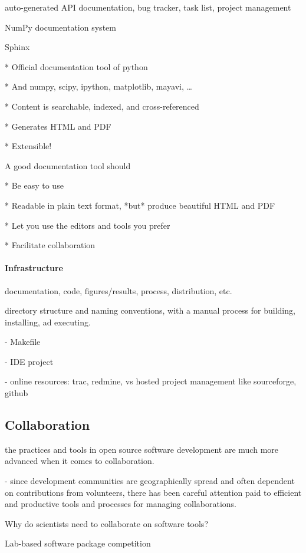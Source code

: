 \documentclass[ChapterTOCs,krantz2]{krantz} %
\begin{document}
auto-generated API documentation, bug tracker, task list, project management

NumPy documentation system \cite{SciPyProceedings_27}

Sphinx

* Official documentation tool of python

* And numpy, scipy, ipython, matplotlib, mayavi, \ldots

* Content is searchable, indexed, and cross-referenced

* Generates HTML and PDF

* Extensible!

A good documentation tool should

* Be easy to use

* Readable in plain text format, *but* produce beautiful HTML and PDF

* Let you use the editors and tools you prefer

* Facilitate collaboration

\paragraph{ {\bf Infrastructure}}

documentation, code, figures/results, process, distribution, etc.

directory structure and naming conventions, with a manual process
for building, installing, ad executing.

- Makefile

- IDE project

- online resources: trac, redmine, vs hosted project management like
sourceforge, github


\subsection{Collaboration}

the practices and tools in open source software development
are much more advanced when it comes to collaboration.

- since development communities are geographically spread
and often dependent on contributions from volunteers, there
has been careful attention paid to efficient and productive
tools and processes for managing collaborations.

Why do scientists need to collaborate on software tools?

Lab-based software package competition
\end{document}
